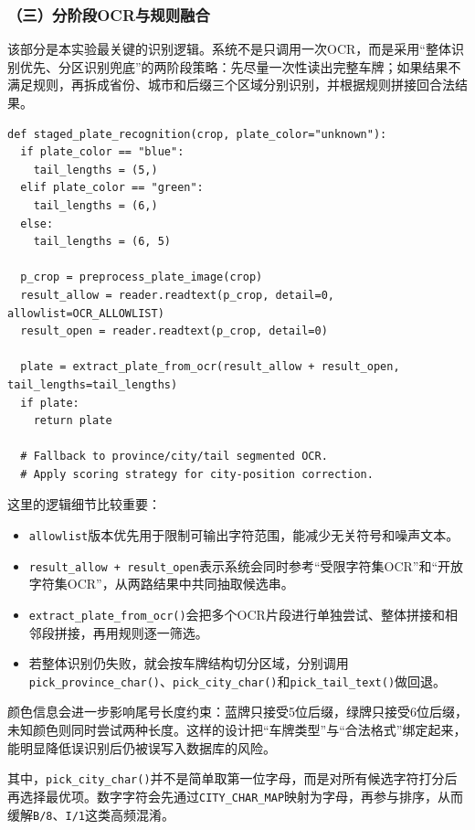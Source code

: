 \documentclass[12pt,a4paper]{article}
\begin{document}
\subsubsection*{（三）分阶段OCR与规则融合}
该部分是本实验最关键的识别逻辑。系统不是只调用一次OCR，而是采用“整体识别优先、分区识别兜底”的两阶段策略：先尽量一次性读出完整车牌；如果结果不满足规则，再拆成省份、城市和后缀三个区域分别识别，并根据规则拼接回合法结果。

\begin{lstlisting}
def staged_plate_recognition(crop, plate_color="unknown"):
  if plate_color == "blue":
    tail_lengths = (5,)
  elif plate_color == "green":
    tail_lengths = (6,)
  else:
    tail_lengths = (6, 5)

  p_crop = preprocess_plate_image(crop)
  result_allow = reader.readtext(p_crop, detail=0, allowlist=OCR_ALLOWLIST)
  result_open = reader.readtext(p_crop, detail=0)

  plate = extract_plate_from_ocr(result_allow + result_open, tail_lengths=tail_lengths)
  if plate:
    return plate

  # Fallback to province/city/tail segmented OCR.
  # Apply scoring strategy for city-position correction.
\end{lstlisting}

这里的逻辑细节比较重要：
\begin{itemize}
  \item \texttt{allowlist}版本优先用于限制可输出字符范围，能减少无关符号和噪声文本。
  \item \texttt{result\_allow + result\_open}表示系统会同时参考“受限字符集OCR”和“开放字符集OCR”，从两路结果中共同抽取候选串。
  \item \texttt{extract\_plate\_from\_ocr()}会把多个OCR片段进行单独尝试、整体拼接和相邻段拼接，再用规则逐一筛选。
  \item 若整体识别仍失败，就会按车牌结构切分区域，分别调用\texttt{pick\_province\_char()}、\texttt{pick\_city\_char()}和\texttt{pick\_tail\_text()}做回退。
\end{itemize}

颜色信息会进一步影响尾号长度约束：蓝牌只接受5位后缀，绿牌只接受6位后缀，未知颜色则同时尝试两种长度。这样的设计把“车牌类型”与“合法格式”绑定起来，能明显降低误识别后仍被误写入数据库的风险。

其中，\texttt{pick\_city\_char()}并不是简单取第一位字母，而是对所有候选字符打分后再选择最优项。数字字符会先通过\texttt{CITY\_CHAR\_MAP}映射为字母，再参与排序，从而缓解\texttt{B/8}、\texttt{I/1}这类高频混淆。
\end{document}
